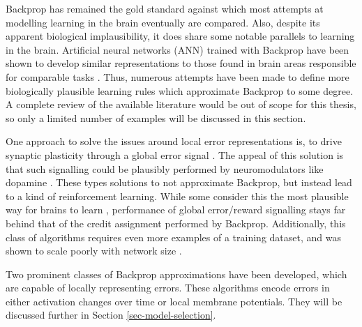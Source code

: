 Backprop has remained the gold standard against which most attempts at modelling learning in the brain eventually are
compared. Also, despite its apparent biological implausibility, it does share some notable parallels to learning in the
brain. Artificial neural networks (ANN) trained with Backprop have been shown to develop similar representations to
those found in brain areas responsible for comparable tasks
\citep{Yamins2016,Whittington2018,KhalighRazavi2014,Kubilius2016}. Thus, numerous attempts have been made to define more
biologically plausible learning rules which approximate Backprop to some degree. A complete review of the available
literature would be out of scope for this thesis, so only a limited number of examples will be discussed in this
section. \newline


\noindent One approach to solve the issues around local error representations is, to drive synaptic plasticity through a
global error signal \citep{potjans2011imperfect,mozafari2018combining,sutton2018reinforcement}. The appeal of this
solution is that such signalling could be plausibly performed by neuromodulators like dopamine
\citep{Mazzoni1991,Seung2003,izhikevich2007solving}. These types solutions to not approximate Backprop, but instead lead
to a kind of reinforcement learning. While some consider this the most plausible way for brains to learn
\citep{sutton2018reinforcement}, performance of global error/reward signalling stays far behind that of the credit
assignment performed by Backprop. Additionally, this class of algorithms requires even more examples of a training
dataset, and was shown to scale poorly with network size \citep{Werfel2003}.

Two prominent classes of Backprop approximations have been developed, which are capable of locally representing errors.
These algorithms encode errors in either activation changes over time or local membrane potentials. They will be
discussed further in Section \ref{sec-model-selection}.\newline


